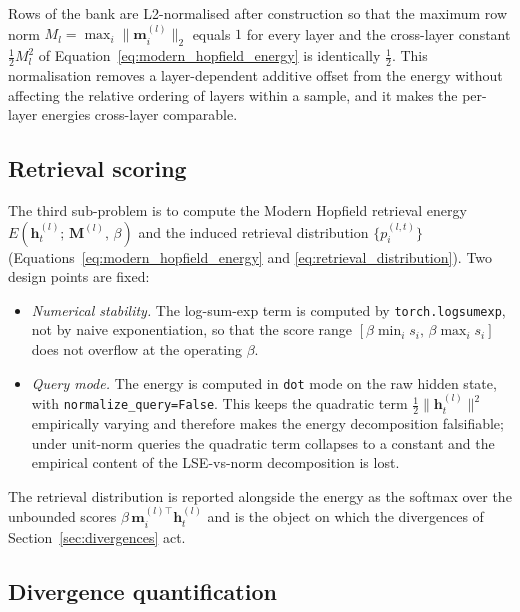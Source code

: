 Rows of the bank are L2-normalised after construction so that the
maximum row norm $M_l = \max_i \|\mathbf{m}_i^{(l)}\|_2$ equals $1$ for
every layer and the cross-layer constant $\tfrac{1}{2}M_l^2$ of
Equation~\eqref{eq:modern_hopfield_energy} is identically $\tfrac{1}{2}$.
This normalisation removes a layer-dependent additive offset from the
energy without affecting the relative ordering of layers within a sample,
and it makes the per-layer energies cross-layer comparable.

\subsection{Retrieval scoring}
\label{subsec:retrieval_scoring}

The third sub-problem is to compute the Modern Hopfield retrieval energy
$E(\mathbf{h}_t^{(l)};\,\mathbf{M}^{(l)},\,\beta)$ and the induced
retrieval distribution $\{p_i^{(l,t)}\}$
(Equations~\ref{eq:modern_hopfield_energy} and
\ref{eq:retrieval_distribution}). Two design points are fixed:

\begin{itemize}[leftmargin=*]
    \item \emph{Numerical stability.} The log-sum-exp term is computed by
          \texttt{torch.logsumexp}, not by naive exponentiation, so that
          the score range $[\beta \min_i s_i,\,\beta \max_i s_i]$ does not
          overflow at the operating $\beta$.
    \item \emph{Query mode.} The energy is computed in \texttt{dot} mode
          on the raw hidden state, with \texttt{normalize\_query=False}.
          This keeps the quadratic term $\tfrac{1}{2}\|\mathbf{h}_t^{(l)}\|^2$
          empirically varying and therefore makes the energy decomposition
          falsifiable; under unit-norm queries the quadratic term collapses
          to a constant and the empirical content of the LSE-vs-norm
          decomposition is lost.
\end{itemize}

The retrieval distribution is reported alongside the energy as the
softmax over the unbounded scores
$\beta\,\mathbf{m}_i^{(l)\!\top}\mathbf{h}_t^{(l)}$ and is the object on
which the divergences of Section~\ref{sec:divergences} act.

\subsection{Divergence quantification}
\label{subsec:divergence_quant}

